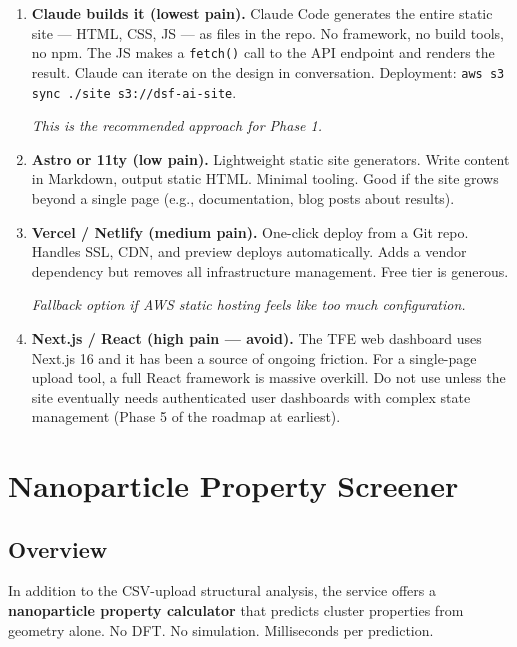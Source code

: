 \documentclass[11pt,letterpaper]{article}
\begin{document}
\begin{enumerate}
  \item \textbf{Claude builds it (lowest pain).} Claude Code
    generates the entire static site --- HTML, CSS, JS --- as files
    in the repo. No framework, no build tools, no npm. The JS
    makes a \texttt{fetch()} call to the API endpoint and renders
    the result. Claude can iterate on the design in conversation.
    Deployment: \texttt{aws s3 sync ./site s3://dsf-ai-site}.

    \textit{This is the recommended approach for Phase 1.}

  \item \textbf{Astro or 11ty (low pain).} Lightweight static site
    generators. Write content in Markdown, output static HTML.
    Minimal tooling. Good if the site grows beyond a single page
    (e.g., documentation, blog posts about results).

  \item \textbf{Vercel / Netlify (medium pain).} One-click deploy
    from a Git repo. Handles SSL, CDN, and preview deploys
    automatically. Adds a vendor dependency but removes all
    infrastructure management. Free tier is generous.

    \textit{Fallback option if AWS static hosting feels like too
    much configuration.}

  \item \textbf{Next.js / React (high pain --- avoid).} The TFE
    web dashboard uses Next.js 16 and it has been a source of
    ongoing friction. For a single-page upload tool, a full React
    framework is massive overkill. Do not use unless the site
    eventually needs authenticated user dashboards with complex
    state management (Phase 5 of the roadmap at earliest).
\end{enumerate}

\section{Nanoparticle Property Screener}

\subsection{Overview}

In addition to the CSV-upload structural analysis, the service offers
a \textbf{nanoparticle property calculator} that predicts cluster
properties from geometry alone. No DFT. No simulation. Milliseconds
per prediction.
\end{document}
